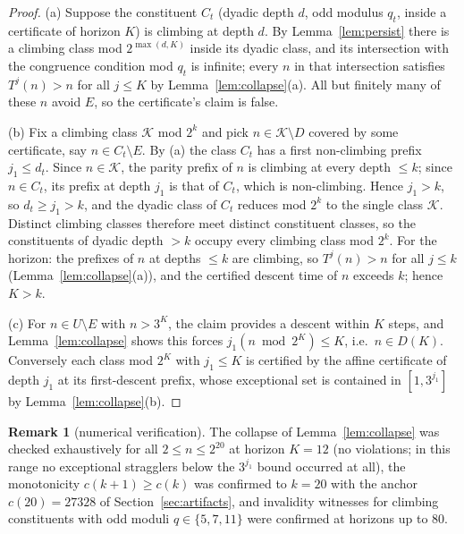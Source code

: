 \documentclass[11pt]{article}
\theoremstyle{definition}
\newtheorem{remark}[theorem]{Remark}
\begin{document}
\begin{proof}
(a) Suppose the constituent $C_t$ (dyadic depth $d$, odd modulus $q_t$,
inside a certificate of horizon $K$) is climbing at depth $d$. By
Lemma~\ref{lem:persist} there is a climbing class mod $2^{\max(d,K)}$
inside its dyadic class, and its intersection with the congruence
condition mod $q_t$ is infinite; every $n$ in that intersection satisfies
$T^j(n)>n$ for all $j\le K$ by Lemma~\ref{lem:collapse}(a). All but
finitely many of these $n$ avoid $E$, so the certificate's claim is false.

(b) Fix a climbing class $\mathcal{K}$ mod $2^k$ and pick
$n\in\mathcal{K}\setminus D$ covered by some certificate, say
$n\in C_t\setminus E$. By (a) the class $C_t$ has a first non-climbing
prefix $j_1\le d_t$. Since $n\in\mathcal{K}$, the parity prefix of $n$ is
climbing at every depth $\le k$; since $n\in C_t$, its prefix at depth
$j_1$ is that of $C_t$, which is non-climbing. Hence $j_1>k$, so
$d_t\ge j_1>k$, and the dyadic class of $C_t$ reduces mod $2^k$ to the
single class $\mathcal{K}$. Distinct climbing classes therefore meet
distinct constituent classes, so the constituents of dyadic depth $>k$
occupy every climbing class mod $2^k$. For the horizon: the prefixes of $n$ at depths
$\le k$ are climbing, so $T^j(n)>n$ for all $j\le k$
(Lemma~\ref{lem:collapse}(a)), and the certified descent time of $n$
exceeds $k$; hence $K>k$.

(c) For $n\in U\setminus E$ with $n>3^K$, the claim provides a descent
within $K$ steps, and Lemma~\ref{lem:collapse} shows this forces
$j_1(n\bmod 2^K)\le K$, i.e.\ $n\in D(K)$. Conversely each class mod
$2^K$ with $j_1\le K$ is certified by the affine certificate of depth
$j_1$ at its first-descent prefix, whose exceptional set is contained in
$[1,3^{j_1}]$ by Lemma~\ref{lem:collapse}(b).
\end{proof}

\begin{remark}[numerical verification]\label{rem:adaptivenum}
The collapse of Lemma~\ref{lem:collapse} was checked exhaustively for all
$2\le n\le 2^{20}$ at horizon $K=12$ (no violations; in this range no
exceptional stragglers below the $3^{j_1}$ bound occurred at all), the
monotonicity $c(k+1)\ge c(k)$ was confirmed to $k=20$ with the anchor
$c(20)=27328$ of Section~\ref{sec:artifacts}, and invalidity witnesses for
climbing constituents with odd moduli $q\in\{5,7,11\}$ were confirmed at
horizons up to $80$.
\end{remark}
\end{document}
